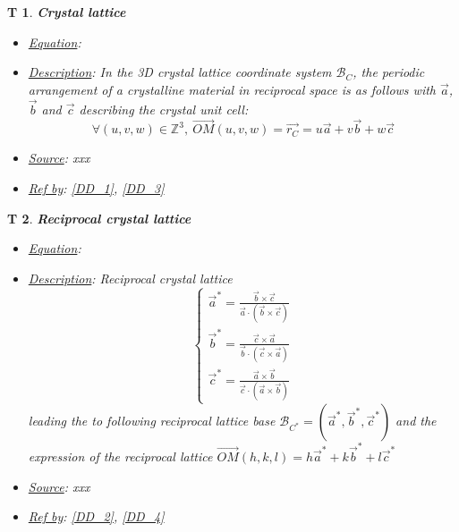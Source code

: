\documentclass[12pt]{article}
\newtheorem{T}{T}
\begin{document}
\begin{T}
\label{T_2}
\noindent\colorbox{shadecolorT}{\normalfont \textbf{Crystal lattice}}
\normalfont
\begin{itemize}
\item \underline{Equation}: 
\item \underline{Description}: In the 3D crystal lattice coordinate system $\mathcal{B}_C$, the periodic arrangement of a crystalline material in reciprocal space is as follows with $\vec{a}$, $\vec{b}$ and $\vec{c}$ describing the crystal unit cell:
\begin{equation}
\forall (u,v,w) \in \mathbb{Z}^{3}, \ \overrightarrow{OM}(u,v,w) = \vec{r_C} = u \vec{a} + v \vec{b} + w \vec{c} 
\label{eq:crystal_1}
\end{equation}
\item \underline{Source}: xxx
\item \underline{Ref by}: \cref{DD_1}, \cref{DD_3}
\end{itemize}
\end{T}

\begin{T}
\label{T_3}
\noindent\colorbox{shadecolorT}{\normalfont \textbf{Reciprocal crystal lattice}}
\normalfont
\begin{itemize}
\item \underline{Equation}: 
\item \underline{Description}: Reciprocal crystal lattice
\begin{equation}
\begin{cases}
\vec{a}^{*} = \frac{\vec{b}\times \vec{c}}{\vec{a}\cdot(\vec{b}\times \vec{c})} \\
\vec{b}^{*} = \frac{\vec{c}\times \vec{a}}{\vec{b}\cdot(\vec{c}\times \vec{a})} \\
\vec{c}^{*} = \frac{\vec{a}\times \vec{b}}{\vec{c}\cdot(\vec{a}\times \vec{b})}
\end{cases}
\label{eq:rec_crystal_1}
\end{equation}
leading the to following reciprocal lattice base $\mathcal{B}_{C^{*}}=(\vec{a}^{*}, \vec{b}^{*}, \vec{c}^{*})$ and the expression of the reciprocal lattice $\vec{OM}(h,k,l) = h\vec{a}^{*} + k\vec{b}^{*} + l\vec{c}^{*}$
\item \underline{Source}: xxx
\item \underline{Ref by}: \cref{DD_2}, \cref{DD_4}
\end{itemize}
\end{T}
\end{document}
